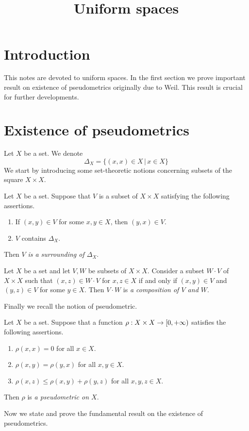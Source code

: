 



\title{Uniform spaces}
\date{}
\maketitle

\section{Introduction}
\noindent
This notes are devoted to uniform spaces. In the first section we prove important result on existence of pseudometrics originally due to Weil. This result is crucial for further developments.

\section{Existence of pseudometrics}
\noindent
Let $X$ be a set. We denote 
$$\Delta_X = \big\{(x,x)\in X\,\big|\,x\in X\big\}$$
We start by introducing some set-theoretic notions concerning subsets of the square $X\times X$.

\begin{definition}
Let $X$ be a set. Suppose that $V$ is a subset of $X\times X$ satisfying the following assertions.
\begin{enumerate}[label=\textbf{(\arabic*)}, leftmargin=*]
\item If $(x,y)\in V$ for some $x,y\in X$, then $(y,x)\in V$.
\item $V$ contains $\Delta_X$.
\end{enumerate}
Then $V$ \textit{is a surrounding of $\Delta_X$}.
\end{definition}

\begin{definition}
Let $X$ be a set and let $V,W$ be subsets of $X\times X$. Consider a subset $W\cdot V$ of $X\times X$ such that $(x,z) \in W\cdot V$ for $x,z\in X$ if and only if $(x,y)\in V$ and $(y,z)\in V$ for some $y\in X$. Then $V\cdot W$ is \textit{a composition of $V$ and $W$}.
\end{definition}
\noindent
Finally we recall the notion of pseudometric.

\begin{definition}
Let $X$ be a set. Suppose that a function $\rho:X\times X\rightarrow [0,+\infty)$ satisfies the following assertions.
\begin{enumerate}[label=\textbf{(\arabic*)}, leftmargin=*]
\item $\rho(x,x) = 0$ for all $x\in X$.
\item $\rho(x,y) = \rho(y,x)$ for all $x,y\in X$.
\item $\rho(x,z)\leq \rho(x,y) + \rho(y,z)$ for all $x,y,z\in X$.
\end{enumerate}
Then $\rho$ is \textit{a pseudometric on $X$}.
\end{definition}
\noindent
Now we state and prove the fundamental result on the existence of pseudometrics.

